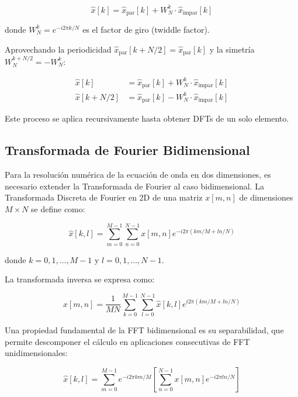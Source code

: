 \documentclass[a4paper]{article}
\begin{document}
\begin{equation}
    \hat{x}[k] = \hat{x}_{\text{par}}[k] + W_N^k \cdot \hat{x}_{\text{impar}}[k]
\end{equation}

donde $W_N^k = e^{-i2\pi k/N}$ es el factor de giro (twiddle factor).

Aprovechando la periodicidad $\hat{x}_{\text{par}}[k + N/2] = \hat{x}_{\text{par}}[k]$ y la simetría $W_N^{k+N/2} = -W_N^k$:

\begin{align}
    \hat{x}[k]       & = \hat{x}_{\text{par}}[k] + W_N^k \cdot \hat{x}_{\text{impar}}[k] \\
    \hat{x}[k + N/2] & = \hat{x}_{\text{par}}[k] - W_N^k \cdot \hat{x}_{\text{impar}}[k]
\end{align}

Este proceso se aplica recursivamente hasta obtener DFTs de un solo elemento.

\subsection{Transformada de Fourier Bidimensional}

Para la resolución numérica de la ecuación de onda en dos dimensiones, es necesario extender la Transformada de Fourier al caso
bidimensional. La Transformada Discreta de Fourier en 2D de una matriz $x[m,n]$ de dimensiones $M \times N$ se define como:

\begin{equation}
    \hat{x}[k,l] = \sum_{m=0}^{M-1} \sum_{n=0}^{N-1} x[m,n] e^{-i2\pi (km/M + ln/N)}
\end{equation}

donde $k = 0, 1, \ldots, M-1$ y $l = 0, 1, \ldots, N-1$.

La transformada inversa se expresa como:

\begin{equation}
    x[m,n] = \frac{1}{MN} \sum_{k=0}^{M-1} \sum_{l=0}^{N-1} \hat{x}[k,l] e^{i2\pi (km/M + ln/N)}
\end{equation}

Una propiedad fundamental de la FFT bidimensional es su separabilidad, que permite descomponer el cálculo en aplicaciones
consecutivas de FFT unidimensionales:

\begin{equation}
    \hat{x}[k,l] = \sum_{m=0}^{M-1} e^{-i2\pi km/M} \left[ \sum_{n=0}^{N-1} x[m,n] e^{-i2\pi ln/N} \right]
\end{equation}
\end{document}
